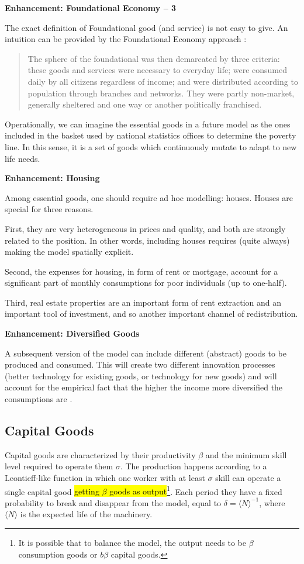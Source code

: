 \documentclass[a4paper, headings=standardclasses]{scrartcl}
\newenvironment{enh}[1][]{\begin{framed}\noindent\textbf{Enhancement: #1}\par}{\end{framed}}
\begin{document}
\begin{enh}[Foundational Economy -- 3]
	The exact definition of Foundational good (and service) is not easy to give. An intuition can be provided by the Foundational Economy approach \parencite{arcidiacono2018}: \begin{quote}
		The sphere of the foundational was then demarcated by three criteria: these goods and services were necessary to everyday life; were consumed daily by all citizens regardless of income; and were distributed according to population through branches and networks. They were partly non-market, generally sheltered and one way or another politically franchised.
	\end{quote}

	Operationally, we can imagine the essential goods in a future model as the ones included in the basket used by national statistics offices to determine the poverty line. In this sense, it is a set of goods which continuously mutate to adapt to new life needs.
\end{enh}

\begin{enh}[Housing]
	Among essential goods, one should require ad hoc modelling: houses. Houses are special for three reasons.

	First, they are very heterogeneous in prices and quality, and both are strongly related to the position. In other words, including houses requires (quite always) making the model spatially explicit.

	Second, the expenses for housing, in form of rent or mortgage, account for a significant part of monthly consumptions for poor individuals (up to one-half).

	Third, real estate properties are an important form of rent extraction and an important tool of investment, and so another important channel of redistribution.
\end{enh}

\begin{enh}[Diversified Goods]
	A subsequent version of the model can include different (abstract) goods to be produced and consumed. This will create two different innovation processes (better technology for existing goods, or technology for new goods) and will account for the empirical fact that the higher the income more diversified the consumptions are \parencite[cfr.][§2]{didomenico2022}.
\end{enh}

\subsection{Capital Goods}
Capital goods are characterized by their productivity $\beta$ and the minimum skill level required to operate them $\sigma$. The production happens according to a Leontieff-like function in which one worker with at least $\sigma$ skill can operate a single capital good \hl{ getting $\beta$ goods as output}\footnote{It is possible that to balance the model, the output needs to be $\beta$ consumption goods or $b\beta$ capital goods.}. Each period they have a fixed probability to break and disappear from the model, equal to $\delta = \langle N \rangle^{-1}$, where $\langle N \rangle$ is the expected life of the machinery.
\end{document}
